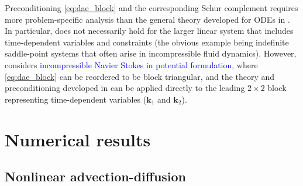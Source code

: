 \documentclass[review]{siamart}
\newcommand{\tcb}{\textcolor{blue}}
\begin{document}
Preconditioning \eqref{eq:dae_block} and the corresponding
Schur complement requires more problem-specific analysis than the general
theory developed for ODEs in . In particular, 
does not necessarily hold for the larger linear system that includes
time-dependent variables and constraints (the obvious example being indefinite
saddle-point systems that often arise in incompressible fluid dynamics).
However,  considers \tcb{incompressible Navier Stokes
in potential formulation}, where \eqref{eq:dae_block} can be reordered to
be block triangular, and the theory and preconditioning developed in
 can be applied directly to the leading $2\times 2$ block
representing time-dependent variables ($\mathbf{k}_1$ and $\mathbf{k}_2$).




\section{Numerical results}\label{sec:numerics}

\subsection{Nonlinear advection-diffusion}\label{sec:numerics:advdiff}



\end{document}
